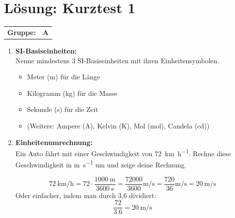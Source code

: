 \documentclass[11pt, a4paper]{article}
\begin{document}
\section*{\LARGE Lösung: Kurztest 1}
\noindent
\begin{tabular}{ll}
    \textbf{Gruppe: } & \LARGE\textbf{A}  \\[0.3cm]
\end{tabular}

  
\begin{enumerate}[label=\textbf{\arabic*.},itemsep=0.50cm]
    
    \item \textbf{SI-Basiseinheiten:} \\
    Nenne mindestens 3 SI-Basiseinheiten mit ihren Einheitensymbolen.
    \begin{solutionbox}
        \begin{itemize}[itemsep=0pt, topsep=0pt]
            \item Meter (m) für die Länge
            \item Kilogramm (kg) für die Masse
            \item Sekunde (s) für die Zeit
            \item (Weitere: Ampere (A), Kelvin (K), Mol (mol), Candela (cd))
        \end{itemize}
    \end{solutionbox}
    
    \item \textbf{Einheitenumrechnung:} \\
    Ein Auto fährt mit einer Geschwindigkeit von \SI{72}{\kilo\meter\per\hour}. Rechne diese Geschwindigkeit in \unit{\meter\per\second} um und zeige deine Rechnung.    
    \begin{solutionbox}
        \[ \SI{72}{\kilo\meter\per\hour} = 72 \cdot \frac{\SI{1000}{\meter}}{\SI{3600}{\second}} = \frac{72000}{3600} \si{\meter\per\second} = \frac{720}{36} \si{\meter\per\second} = \SI{20}{\meter\per\second} \]
        Oder einfacher, indem man durch 3,6 dividiert:
        \[ \frac{72}{\num{3.6}} = \SI{20}{\meter\per\second} \]
    \end{solutionbox}
    

\end{enumerate}
\end{document}
